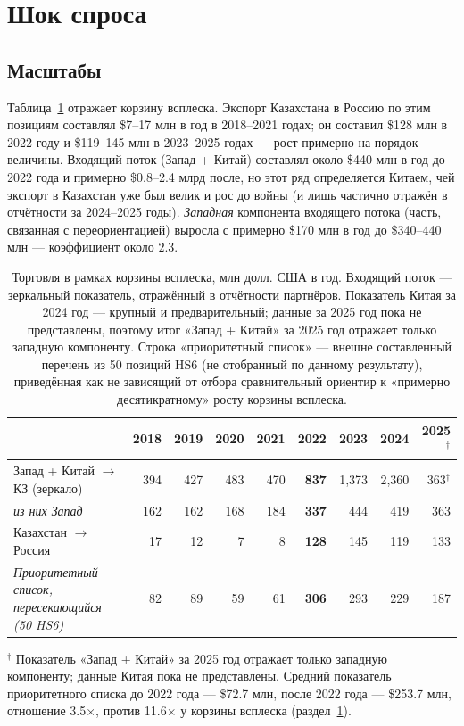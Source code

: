 \documentclass[12pt]{article}
\begin{document}
\section{Шок спроса}\label{sec:shock}

\subsection{Масштабы}

Таблица~\ref{tab:magnitudes} отражает корзину всплеска. Экспорт Казахстана в Россию по этим
позициям составлял \$7--17 млн в год в 2018--2021 годах; он составил \$128 млн в 2022 году
и \$119--145 млн в 2023--2025 годах — рост примерно на порядок величины. Входящий поток
(Запад + Китай) составлял около \$440 млн в год до 2022 года и примерно \$0.8--2.4 млрд
после, но этот ряд определяется Китаем, чей экспорт в Казахстан уже был велик и рос до
войны (и лишь частично отражён в отчётности за 2024--2025 годы). \emph{Западная} компонента
входящего потока (часть, связанная с переориентацией) выросла с примерно \$170 млн в год до
\$340--440 млн — коэффициент около $2.3$.

\begin{table}[t]
\centering
\caption{Торговля в рамках корзины всплеска, млн долл. США в год. Входящий поток — зеркальный
показатель, отражённый в отчётности партнёров. Показатель Китая за 2024 год — крупный и
предварительный; данные за 2025 год пока не представлены, поэтому итог «Запад + Китай» за
2025 год отражает только западную компоненту. Строка «приоритетный список» — внешне
составленный перечень из 50 позиций HS6 (не отобранный по данному результату), приведённая
как не зависящий от отбора сравнительный ориентир к «примерно десятикратному» росту корзины
всплеска.}
\label{tab:magnitudes}
\small
\setlength{\tabcolsep}{4pt}
\begin{tabular}{lrrrrrrrr}
\toprule
 & 2018 & 2019 & 2020 & 2021 & \textbf{2022} & 2023 & 2024 & 2025$^{\dagger}$ \\
\midrule
Запад + Китай $\to$ КЗ (зеркало) & 394 & 427 & 483 & 470 & \textbf{837} & 1{,}373 & 2{,}360 & 363$^{\dagger}$ \\
\quad \emph{из них Запад}   & 162 & 162 & 168 & 184 & \textbf{337} & 444 & 419 & 363 \\
Казахстан $\to$ Россия        &  17 &  12 &   7 &   8 & \textbf{128} & 145 & 119 & 133 \\
\emph{Приоритетный список, пересекающийся (50 HS6)} & 82 & 89 & 59 & 61 & \textbf{306} & 293 & 229 & 187 \\
\bottomrule
\end{tabular}

\vspace{2pt}
\footnotesize $^{\dagger}$ Показатель «Запад + Китай» за 2025 год отражает только западную
компоненту; данные Китая пока не представлены. Средний показатель приоритетного списка до
2022 года — \$72.7 млн, после 2022 года — \$253.7 млн, отношение 3.5$\times$, против
11.6$\times$ у корзины всплеска (раздел~\ref{sec:shock}).
\end{table}
\end{document}
